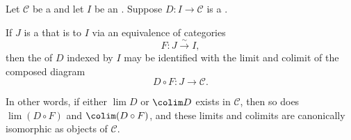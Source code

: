 
\begin{theorem} \label{theorem:limits_colimits_essentially_small}
Let $\mathcal{C}$ be a  and let $I$ be an . Suppose $D: I \to \mathcal{C}$ is a . 

If $J$ is a  that is  to $I$ via an equivalence of categories
\[
F: J \xrightarrow{\sim} I,
\]
then the  of $D$ indexed by $I$ may be identified with the limit and colimit of the composed diagram
\[
D \circ F : J \to \mathcal{C}.
\]

In other words, if either $\lim D$ or $\colim D$ exists in $\mathcal{C}$, then so does $\lim (D \circ F)$ and $\colim (D \circ F)$, and these limits and colimits are canonically isomorphic as objects of $\mathcal{C}$.
\end{theorem}
